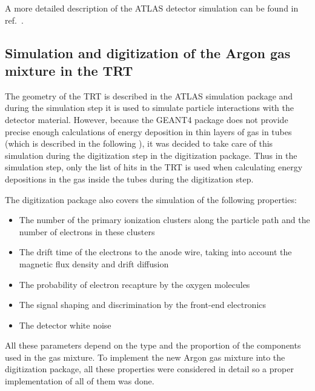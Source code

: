 A more detailed description of the ATLAS detector simulation can be found in ref.~\cite{Aad:2010ah}.

\subsection{Simulation and digitization of the Argon gas mixture in the TRT}
\label{subsec:TRT:argonImpl}


The geometry of the TRT is described in the ATLAS simulation package and during the simulation step it is used to simulate particle interactions with the detector material.
However, because the GEANT4 package does not provide precise enough calculations of energy deposition in thin layers of gas in tubes 
(which is described in the following ), it was decided to take care of this simulation during the digitization step in the digitization package.
Thus in the simulation step, only the list of hits in the TRT is used when calculating energy depositions in the gas inside the tubes during the digitization step.

The digitization package also covers the simulation of the following properties:
\begin{itemize}
 \item The number of the primary ionization clusters along the particle path and the number of electrons in these clusters
 \item The drift time of the electrons to the anode wire, taking into account the magnetic flux density and drift diffusion
 \item The probability of electron recapture by the oxygen molecules
 \item The signal shaping and discrimination by the front-end electronics
 \item The detector white noise
\end{itemize}

All these parameters depend on the type and the proportion of the components used in the gas mixture. 
To implement the new Argon gas mixture into the digitization package, all these properties were considered in detail 
so a proper implementation of all of them was done.

